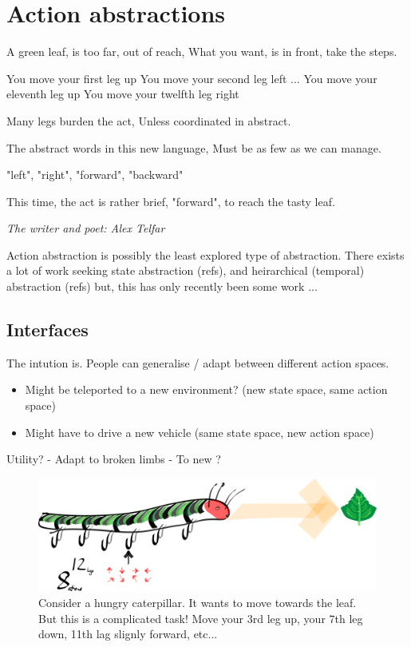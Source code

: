 \newpage
\section{Action abstractions}


\epigraph{
A green leaf, is too far, out of reach,
What you want, is in front, take the steps.

You move your first leg up You move your second leg left ... You move your eleventh leg up You move your twelfth leg right

Many legs burden the act,
Unless coordinated in abstract.

The abstract words in this new language,
Must be as few as we can manage.

"left", "right", "forward", "backward"

This time, the act is rather brief,
"forward", to reach the tasty leaf.
}{\textit{The writer and poet: Alex Telfar}}


Action abstraction is possibly the least explored type of abstraction.
There exists a lot of work seeking state abstraction (refs), and heirarchical (temporal) abstraction (refs)
but, this has only recently been some work ...

\subsection{Interfaces}

The intution is.
People can generalise / adapt between different action spaces.

\begin{itemize}
\tightlist
\item
  Might be teleported to a new environment? (new state space, same
  action space)
\item
  Might have to drive a new vehicle (same state space, new action space)
\end{itemize}


Utility?
- Adapt to broken limbs
- To new ?


\begin{figure}
\centering
\includegraphics[width=\textwidth,height=0.25\textheight]{../../pictures/drawings/hungry-caterpillar.png}
\caption{Consider a hungry caterpillar. It wants to move towards the leaf. But this is a complicated task! Move your 3rd leg up, your 7th leg down, 11th lag slignly forward, etc...}
\end{figure}


